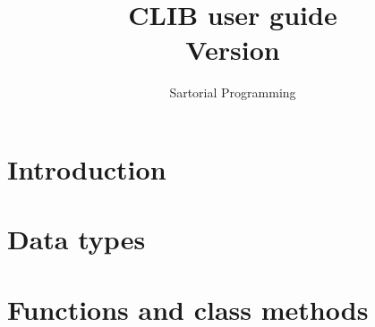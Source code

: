 \documentclass[a4paper] {report}
\author{Sartorial Programming}
\title{CLIB user guide \\ Version \cpplibVersionNumber{}}
\begin{document}
\maketitle
\tableofcontents

\newpage
\chapter{Introduction}



\chapter{Data types}


\chapter{Functions and class methods}

\end{document}
